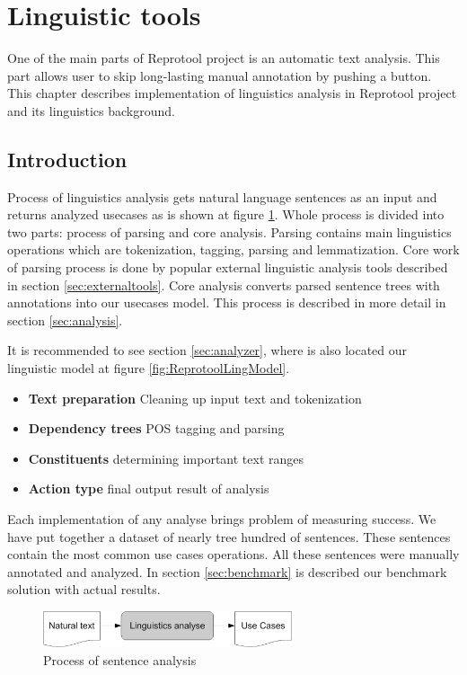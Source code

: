 \section{Linguistic tools}

One of the main parts of Reprotool project is an automatic text analysis. This part allows user to skip long-lasting manual annotation by pushing a button. This chapter describes implementation of linguistics analysis in Reprotool project and its linguistics background.

\subsection{Introduction}
Process of linguistics analysis gets natural language sentences as an input and returns analyzed usecases as is shown at figure \ref{fig:LinguisticsAnalyseSmall}. Whole process is divided into two parts: process of parsing and core analysis. Parsing contains main linguistics operations which are tokenization, tagging, parsing and lemmatization. Core work of parsing process is done by popular external linguistic analysis tools described in section \ref{sec:externaltools}. Core analysis converts parsed sentence trees with annotations into our usecases model. This process is described in more detail in section \ref{sec:analysis}. 

It is recommended to see section \ref{sec:analyzer}, where is also located our linguistic model at figure \ref{fig:ReprotoolLingModel}.

\begin{itemize}
\item {\bf Text preparation} Cleaning up input text and tokenization
\item {\bf Dependency trees} POS tagging and parsing
\item {\bf Constituents} determining important text ranges
\item {\bf Action type} final output result of analysis
\end{itemize}

Each implementation of any analyse brings problem of measuring success. We have put together a dataset of nearly tree hundred of sentences. These sentences contain the most common use cases operations. All these sentences were manually annotated and analyzed. In section \ref{sec:benchmark} is described our benchmark solution with actual results.

\begin{figure}[ht]
  \centering
  \includegraphics[height=30pt]{images/LinguisticsAnalyseSmall}
  \caption{Process of sentence analysis}
  \label{fig:LinguisticsAnalyseSmall}
\end{figure}

